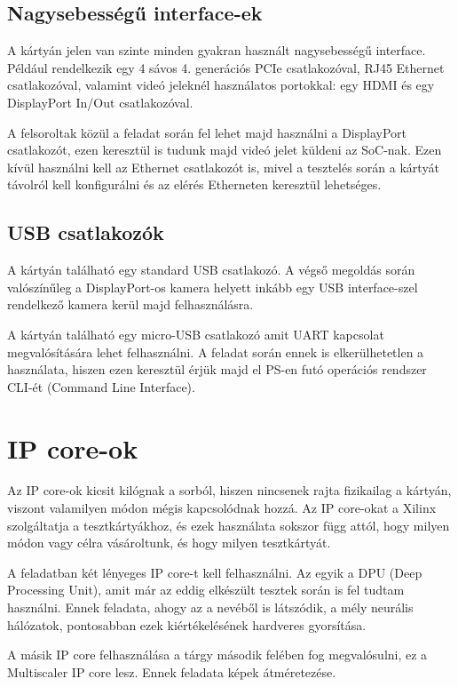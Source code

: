 \subsection{Nagysebességű interface-ek}
A kártyán jelen van szinte minden gyakran használt nagysebességű interface. Például rendelkezik egy 4 sávos 4. generációs PCIe csatlakozóval, RJ45 Ethernet csatlakozóval, valamint videó jeleknél használatos portokkal: egy HDMI és egy DisplayPort In/Out csatlakozóval.

A felsoroltak közül a feladat során fel lehet majd használni a DisplayPort csatlakozót, ezen keresztül is tudunk majd videó jelet küldeni az SoC-nak. Ezen kívül használni kell az Ethernet csatlakozót is, mivel a tesztelés során a kártyát távolról kell konfigurálni és az elérés Etherneten keresztül lehetséges.

\subsection{USB csatlakozók}
A kártyán található egy standard USB csatlakozó. A végső megoldás során valószínűleg a DisplayPort-os kamera helyett inkább egy USB interface-szel rendelkező kamera kerül majd felhasználásra.

A kártyán található egy micro-USB csatlakozó amit UART kapcsolat megvalósítására lehet felhasználni. A feladat során ennek is elkerülhetetlen a használata, hiszen ezen keresztül érjük majd el PS-en futó operációs rendszer CLI-ét (Command Line Interface).

\section{IP core-ok}
Az IP core-ok kicsit kilógnak a sorból, hiszen nincsenek rajta fizikailag a kártyán, viszont valamilyen módon mégis kapcsolódnak hozzá. Az IP core-okat a Xilinx szolgáltatja a tesztkártyákhoz, és ezek használata sokszor függ attól, hogy milyen módon vagy célra vásároltunk, és hogy milyen tesztkártyát.

A feladatban két lényeges IP core-t kell felhasználni. Az egyik a DPU (Deep Processing Unit), amit már az eddig elkészült tesztek során is fel tudtam használni. Ennek feladata, ahogy az a nevéből is látszódik, a mély neurális hálózatok, pontosabban ezek kiértékelésének hardveres gyorsítása.

A másik IP core felhasználása a tárgy második felében fog megvalósulni, ez a Multiscaler IP core lesz. Ennek feladata képek átméretezése.
